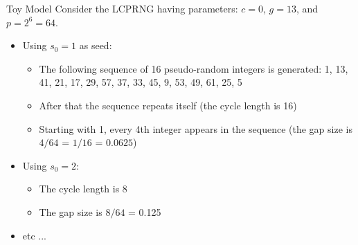 \documentclass[xcolor=x11names,compress]{beamer}
\renewcommand{\(}{\begin{columns}}
\renewcommand{\)}{\end{columns}}
\newcommand{\<}[1]{\begin{column}{#1}}
\renewcommand{\>}{\end{column}}
\begin{document}
\begin{frame}{Toy Model}
Consider the LCPRNG having parameters: $c = 0$, $g = 13$, and $p = 2^6 = 64$. \begin{itemize}
\item Using $s_0=1$ as seed:
\begin{itemize}
\item The following sequence of 16 pseudo-random integers is generated: 1, 13, 41, 21, 17, 29, 57, 37, 33, 45, 9, 53, 49, 61, 25, 5
\item After that the sequence repeats itself (the cycle length is 16)
\item Starting with 1, every 4th integer appears in the sequence (the
gap size is $4/64$ = $1/16$ = $0.0625$)
\end{itemize}
\item Using $s_0=2$:
\begin{itemize}
\item The cycle length is 8
\item The gap size is $8/64$ = 0.125
\end{itemize}
\item etc ...
\end{itemize}
\end{frame}
\end{document}
